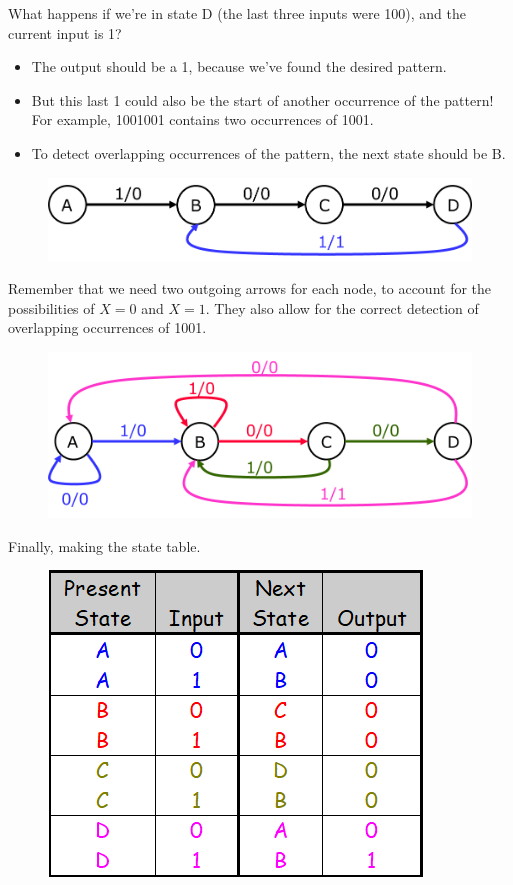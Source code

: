 What happens if we're in state D (the last three inputs were 100), and the current input is 1?
\begin{itemize}
  \item The output should be a 1, because we've found the desired pattern.
  \item But this last 1 could also be the start of another occurrence of the pattern! For example, 1001001 contains two occurrences of 1001.
  \item To detect overlapping occurrences of the pattern, the next state should be B.
\end{itemize}
\begin{figure}[H]
  \centering
  \includegraphics[width=.85\linewidth]{img/design-example-state-diagram-2.png}
\end{figure}

Remember that we need two outgoing arrows for each node, to account for the possibilities of $X = 0$ and $X = 1$. They also allow for the correct detection of overlapping occurrences of 1001.
\begin{figure}[H]
  \centering
  \includegraphics[width=\linewidth]{img/design-example-state-diagram-4.png}
\end{figure}
\noindent Finally, making the state table.
\begin{figure}[H]
  \centering
  \includegraphics[width=.8\linewidth]{img/desing-example-state-table.png}
\end{figure}

